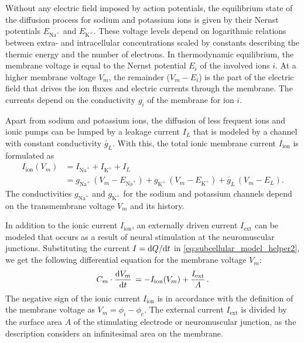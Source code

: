 Without any electric field imposed by action potentials, the equilibrium state of the diffusion process for sodium and potassium ions is given by their Nernst potentials $E_{\text{Na}^{+}}$ and $E_{\text{K}^{+}}$. These voltage levels depend on logarithmic relations between extra- and intracellular concentrations scaled by constants describing the thermic energy and the number of electrons.
In thermodynamic equilibrium, the membrane voltage is equal to the Nernst potential $E_i$ of the involved ions $i$. 
At a higher membrane voltage $V_m$, the remainder ($V_m - E_i$) is the part of the electric field that drives the
ion fluxes and electric currents through the membrane. The currents depend on the conductivity $g_i$ of
the membrane for ion $i$. 

Apart from sodium and potassium ions, the diffusion of less frequent ions and ionic pumps can be lumped by a leakage current $I_L$ that is modeled by a channel with constant conductivity $\bar{g}_L$.
With this, the total ionic membrane current $I_\text{ion}$ is formulated as
%
\begin{subequations}
\begin{align}\label{eq:subcellular_model_helper4}
  I_\text{ion}(V_m)  &= I_{\text{Na}^{+}} + I_{\text{K}^{+}} + I_L \\
  & = g_{\text{Na}^{+}}\,(V_m - E_{\text{Na}^{+}}) + g_{\text{K}^{+}}\,(V_m - E_{\text{K}^{+}}) + \bar{g}_L\,(V_m - E_L). \label{eq:subcellular_model_helper5}
\end{align}
\end{subequations}
%
The conductivities $g_{\text{Na}^{+}}$ and $g_{\text{K}^{+}}$ for the sodium and potassium channels depend on the transmembrane voltage $V_m$ and its history.

In addition to the ionic current $I_\text{ion}$, an externally driven current $I_\text{ext}$ can be modeled that occurs as a result of neural stimulation at the neuromuscular junctions. Substituting the current $I=\d Q / \d t$ in \cref{eq:subcellular_model_helper2}, we get the following differential equation for the membrane voltage $V_m$:
\begin{align}\label{eq:subcellular_model_helper3}
  C_m \cdot \d{V_m}{t} = -I_\text{ion}(V_m) + \dfrac{I_\text{ext}}{A}.
\end{align}
%
The negative sign of the ionic current $I_\text{ion}$ is in accordance with the definition of the membrane voltage as $V_m=\phi_i-\phi_e$. The external current $I_\text{ext}$ is divided by the surface area $A$ of the stimulating electrode or neuromuscular junction, as the description considers an infinitesimal area on the membrane.


